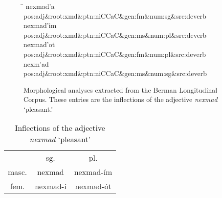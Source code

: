 
\begin{figure}[t]
\begin{mdframed}
\begin{tabbing}
\hspace{1in} \= \hspace{5.5in} \kill
nexmad\a'{a} \> pos:adj\&root:xmd\&ptn:niCCaC\&gen:fm\&num:sg\&src:deverb\\
nexmad\a'{i}m \> pos:adj\&root:xmd\&ptn:niCCaC\&gen:ms\&num:pl\&src:deverb\\
nexmad\a'{o}t \> pos:adj\&root:xmd\&ptn:niCCaC\&gen:fm\&num:pl\&src:deverb\\
nexm\a'{a}d \> pos:adj\&root:xmd\&ptn:niCCaC\&gen:ms\&num:sg\&src:deverb\\
\end{tabbing}
\caption{Morphological analyses extracted from the Berman Longitudinal Corpus. These entries are the inflections
of the adjective \textit{nexmad} `pleasant.'}
\label{fig:analyses}
\end{mdframed}
\end{figure}

   \begin{table}[h!]
      \small
      \centering
       \setlength{\extrarowheight}{8pt}
      \begin{tabular}{ccc} 
 \toprule
 & sg. & pl. \\
\cmidrule{2-3}
    masc. & nexmad & nexmad-\'{i}m \\
    fem. &  nexmad-\'{i} & nexmad-\'{o}t \\
    \bottomrule
    \end{tabular}
    \label{tab:cstr-endings}
    \caption{Inflections of the adjective \textit{nexmad} `pleasant'}
    \end{table}


